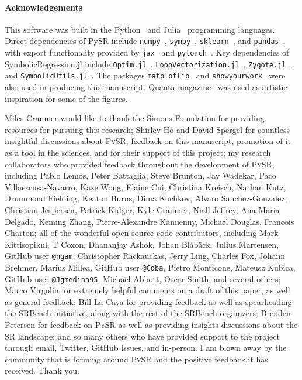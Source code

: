 \documentclass[letterpaper,twocolumn]{scrartcl}
\newcommand\pysr{\textsc{PySR}\xspace}
\newcommand\sr{SR\xspace}
\begin{document}
\paragraph{Acknowledgements}
This software was built in the Python~\cite{vanrossumPythonReferenceManual2009} and Julia~\cite{julia} programming languages.
Direct dependencies of PySR include
\texttt{numpy}~\cite{numpy},
\texttt{sympy}~\cite{sympy},
\texttt{sklearn}~\cite{sklearn},
and
\texttt{pandas}~\cite{pandas},
with export functionality provided by
\texttt{jax}~\cite{jax}
and
\texttt{pytorch}~\cite{torch}.
Key dependencies of SymbolicRegression.jl include
\texttt{Optim.jl}~\cite{mogensenOptimMathematicalOptimization2018}, \texttt{LoopVectorization.jl}~\cite{elrodLoopVectorizationJlMacro2022}, \texttt{Zygote.jl}~\cite{innesDonUnrollAdjoint2018}, and
\texttt{SymbolicUtils.jl}~\cite{gowdaHighperformanceSymbolicnumericsMultiple2022}.
The packages \texttt{matplotlib}~\cite{matplotlib} and
\texttt{showyourwork}~\cite{lugerShowyourwork2021}
were also used in producing this manuscript.
Quanta magazine~\cite{woodPowerfulMachineScientists2022} was used as artistic inspiration for some of the figures.

Miles Cranmer would like to thank
the Simons Foundation for providing resources for pursuing this research;
Shirley Ho and David Spergel for countless insightful discussions about \pysr, feedback on this manuscript, promotion of it as a tool in the sciences, and for their support of this project;
my research collaborators who provided feedback throughout the development of \pysr, including Pablo Lemos, Peter Battaglia, Steve Brunton, Jay Wadekar, Paco Villaescusa-Navarro, Kaze Wong, Elaine Cui, Christina Kreisch, Nathan Kutz, Drummond Fielding, Keaton Burns, Dima Kochkov, Alvaro Sanchez-Gonzalez, Christian Jespersen, Patrick Kidger, Kyle Cranmer, Niall Jeffrey, Ana Maria Delgado, Keming Zhang, Pierre-Alexandre Kamienny, Michael Douglas, Francois Charton;
all of the wonderful open-source code contributors, including Mark Kittisopikul, T Coxon, Dhananjay Ashok, Johan Blåbäck, Julius Martensen, GitHub user \texttt{@ngam}, Christopher Rackauckas, Jerry Ling, Charles Fox, Johann Brehmer, Marius Millea, GitHub user \texttt{@Coba}, Pietro Monticone, Mateusz Kubica, GitHub user \texttt{@Jgmedina95}, Michael Abbott, Oscar Smith, and several others;
Marco Virgolin for extremely helpful comments on a draft of this paper, as well as general feedback;
Bill La Cava for providing feedback as well as spearheading the SRBench initiative, along with the rest of the SRBench organizers;
Brenden Petersen for feedback on \pysr as well as providing insights discussions about the \sr landscape;
and so many others who have provided support to the project through email, Twitter, GitHub issues, and in-person.
I am blown away by the community that is forming around \pysr and the positive feedback it has received. Thank you.





\end{document}
